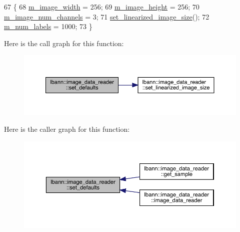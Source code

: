 \begin{DoxyCode}
67                                      \{
68   \hyperlink{classlbann_1_1image__data__reader_af001f3d1c0f1c580b66988233b3a64f0}{m\_image\_width} = 256;
69   \hyperlink{classlbann_1_1image__data__reader_a0632efa3deaa9d61e671f741909eb3fe}{m\_image\_height} = 256;
70   \hyperlink{classlbann_1_1image__data__reader_aab1a440f361521dc7bd583cefe1061f8}{m\_image\_num\_channels} = 3;
71   \hyperlink{classlbann_1_1image__data__reader_a0164b0e3abbe92daef73b36fb925403e}{set\_linearized\_image\_size}();
72   \hyperlink{classlbann_1_1image__data__reader_af280e8758a6ec3acee7c62e6351d17e0}{m\_num\_labels} = 1000;
73 \}
\end{DoxyCode}
Here is the call graph for this function\+:\nopagebreak
\begin{figure}[H]
\begin{center}
\leavevmode
\includegraphics[width=350pt]{classlbann_1_1image__data__reader_a8e9dbeaa0239d56597455cc23787a21d_cgraph}
\end{center}
\end{figure}
Here is the caller graph for this function\+:\nopagebreak
\begin{figure}[H]
\begin{center}
\leavevmode
\includegraphics[width=350pt]{classlbann_1_1image__data__reader_a8e9dbeaa0239d56597455cc23787a21d_icgraph}
\end{center}
\end{figure}
\mbox{\label{classlbann_1_1image__data__reader_a6ed9b8b12ad3ffa93ad458d872f8c044}} 
